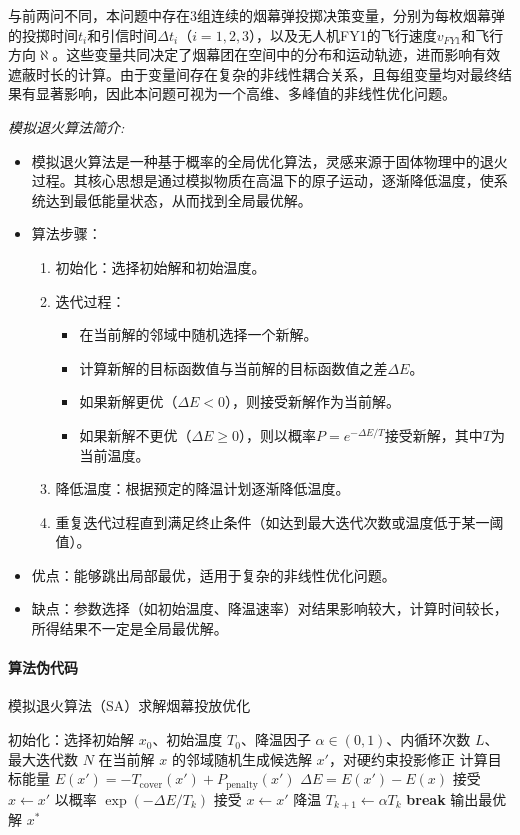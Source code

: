\documentclass{article}
\begin{document}
与前两问不同，本问题中存在3组连续的烟幕弹投掷决策变量，分别为每枚烟幕弹的投掷时间$t_i$和引信时间$\Delta t_i$（$i=1,2,3$），以及无人机FY1的飞行速度$v_{FY1}$和飞行方向$\aleph$。这些变量共同决定了烟幕团在空间中的分布和运动轨迹，进而影响有效遮蔽时长的计算。由于变量间存在复杂的非线性耦合关系，且每组变量均对最终结果有显著影响，因此本问题可视为一个高维、多峰值的非线性优化问题。

\textit{模拟退火算法简介:}
\begin{itemize}
    \item 模拟退火算法是一种基于概率的全局优化算法，灵感来源于固体物理中的退火过程。其核心思想是通过模拟物质在高温下的原子运动，逐渐降低温度，使系统达到最低能量状态，从而找到全局最优解。
    \item 算法步骤：
    \begin{enumerate}
        \item 初始化：选择初始解和初始温度。
        \item 迭代过程：
        \begin{itemize}
            \item 在当前解的邻域中随机选择一个新解。
            \item 计算新解的目标函数值与当前解的目标函数值之差$\Delta E$。
            \item 如果新解更优（$\Delta E < 0$），则接受新解作为当前解。
            \item 如果新解不更优（$\Delta E \geq 0$），则以概率$P = e^{-\Delta E / T}$接受新解，其中$T$为当前温度。
        \end{itemize}
        \item 降低温度：根据预定的降温计划逐渐降低温度。
        \item 重复迭代过程直到满足终止条件（如达到最大迭代次数或温度低于某一阈值）。
    \end{enumerate}
    \item 优点：能够跳出局部最优，适用于复杂的非线性优化问题。
    \item 缺点：参数选择（如初始温度、降温速率）对结果影响较大，计算时间较长，所得结果不一定是全局最优解。
\end{itemize}
\paragraph{算法伪代码}
\begin{algorithm}[H]
\caption{模拟退火算法（SA）求解烟幕投放优化}
\begin{algorithmic}[1]
\State 初始化：选择初始解 $x_0$、初始温度 $T_0$、降温因子 $\alpha\in(0,1)$、内循环次数 $L$、最大迭代数 $N$
    \State 在当前解 $x$ 的邻域随机生成候选解 $x'$，对硬约束投影修正
    \State 计算目标能量 $E(x')=-T_{\mathrm{cover}}(x')+P_{\mathrm{penalty}}(x')$
    \State $\Delta E=E(x')-E(x)$
     接受 $x\leftarrow x'$
    \Else \State 以概率 $\exp(-\Delta E/T_k)$ 接受 $x\leftarrow x'$
    \EndIf
  \EndFor
  \State 降温 $T_{k+1}\leftarrow \alpha T_k$
   \textbf{break}
  \EndIf
\EndFor
\State 输出最优解 $x^*$
\end{algorithmic}
\end{algorithm}
\end{document}
